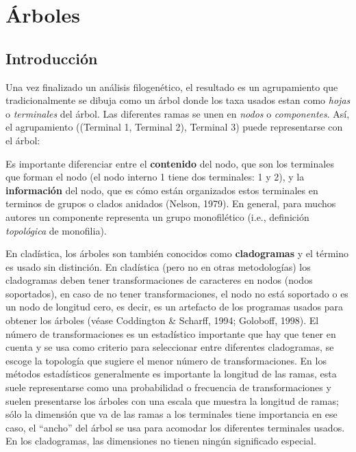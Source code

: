 \chapter{\'Arboles}
\section*{Introducci\'on}

Una vez finalizado un an\'alisis filogen\'etico, el resultado es un agrupamiento que tradicionalmente se dibuja como un \'arbol donde los taxa usados estan como \emph{hojas} o \emph{terminales} del \'arbol. Las diferentes ramas se unen en \emph{nodos} o \emph{componentes}. As\'i, el agrupamiento ((Terminal 1, Terminal 2), Terminal 3) puede representarse con el \'arbol:

\begin{center}
%
%
\end{center}

Es importante diferenciar entre el \textbf{contenido} del nodo, que son los terminales que forman el nodo (el nodo interno 1 tiene dos terminales: 1 y 2), y la \textbf{informaci\'on} del nodo, que es c\'omo est\'an organizados estos terminales en terminos de grupos o clados anidados (Nelson, 1979). En general, para muchos autores un componente representa un grupo monofil\'etico (i.e., definici\'on \emph{topol\'ogica} de monofilia).

En clad\'istica, los \'arboles son tambi\'en conocidos como \textbf{cladogramas} y el t\'ermino es usado sin distinci\'on. En clad\'istica (pero no en otras metodolog\'ias) los cladogramas deben tener transformaciones de caracteres en nodos (nodos soportados), en caso de no tener transformaciones, el nodo no est\'a soportado o es un nodo de longitud cero, es decir, es un artefacto de los programas usados para obtener los \'arboles (v\'ease Coddington \& Scharff, 1994; Goloboff, 1998). El n\'umero de transformaciones es un estad\'istico importante que hay que tener en cuenta y se usa como criterio para seleccionar entre diferentes cladogramas, se escoge la topolog\'ia que sugiere el  menor n\'umero de transformaciones. En los m\'etodos estad\'isticos generalmente es importante la longitud de las ramas, esta suele representarse como una probabilidad o frecuencia de transformaciones y suelen presentarse los \'arboles con una escala que muestra la longitud de ramas; s\'olo la dimensi\'on que va de las ramas a los terminales tiene importancia en ese caso, el ``ancho'' del \'arbol se usa para acomodar los diferentes terminales usados. En los cladogramas, las dimensiones no tienen ning\'un significado especial.


